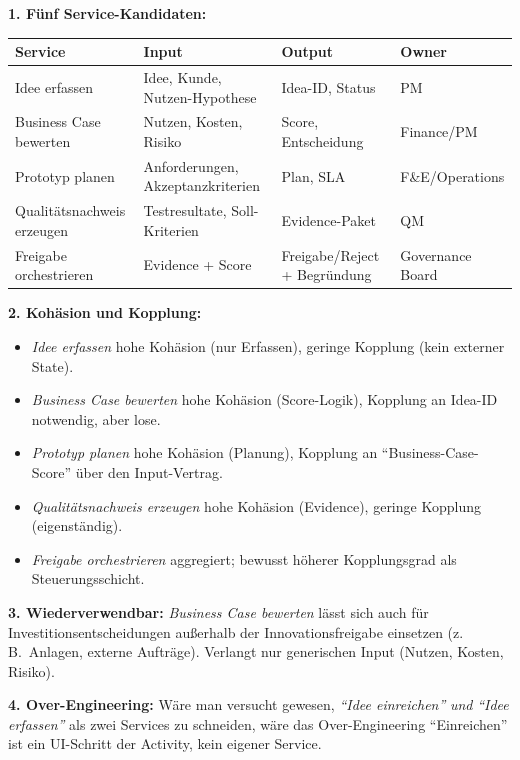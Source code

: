 \documentclass[11pt,a4paper,oneside]{article}
\begin{document}
\begin{loesungbox}
\textbf{1. F\"unf Service-Kandidaten:}

\begin{tabularx}{\linewidth}{@{}p{3.6cm}XXl@{}}
\toprule
\textbf{Service} & \textbf{Input} & \textbf{Output} & \textbf{Owner} \\
\midrule
Idee erfassen           & Idee, Kunde, Nutzen-Hypothese & Idea-ID, Status & PM \\
Business Case bewerten  & Nutzen, Kosten, Risiko        & Score, Entscheidung & Finance/PM \\
Prototyp planen         & Anforderungen, Akzeptanzkriterien & Plan, SLA & F\&E/Operations \\
Qualit\"atsnachweis erzeugen & Testresultate, Soll-Kriterien & Evidence-Paket & QM \\
Freigabe orchestrieren  & Evidence + Score              & Freigabe/Reject + Begr\"undung & Governance Board \\
\bottomrule
\end{tabularx}

\smallskip
\textbf{2. Kohäsion und Kopplung:}
\begin{itemize}
  \item \emph{Idee erfassen} \textendash{} hohe Kohäsion (nur Erfassen), geringe Kopplung (kein externer State).
  \item \emph{Business Case bewerten} \textendash{} hohe Kohäsion (Score-Logik), Kopplung an Idea-ID notwendig, aber lose.
  \item \emph{Prototyp planen} \textendash{} hohe Kohäsion (Planung), Kopplung an ``Business-Case-Score'' \"uber den Input-Vertrag.
  \item \emph{Qualit\"atsnachweis erzeugen} \textendash{} hohe Kohäsion (Evidence), geringe Kopplung (eigenst\"andig).
  \item \emph{Freigabe orchestrieren} \textendash{} aggregiert; bewusst h\"oherer Kopplungsgrad als Steuerungsschicht.
\end{itemize}

\smallskip
\textbf{3. Wiederverwendbar:}
\emph{Business Case bewerten} \textendash{} l\"asst sich auch f\"ur Investitionsentscheidungen au{\ss}erhalb der Innovationsfreigabe einsetzen (z.\,B.\ Anlagen, externe Auftr\"age). Verlangt nur generischen Input (Nutzen, Kosten, Risiko).

\smallskip
\textbf{4. Over-Engineering:}
W\"are man versucht gewesen, \emph{``Idee einreichen''} \emph{und} \emph{``Idee erfassen''} als zwei Services zu schneiden, w\"are das Over-Engineering \textendash{} ``Einreichen'' ist ein UI-Schritt der Activity, kein eigener Service.
\end{loesungbox}
\end{document}
